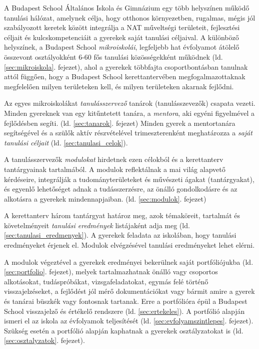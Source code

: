A Budapest School Általános Iskola és Gimnázium egy több helyszínen működő
tanulási hálózat, amelynek célja, hogy otthonos környezetben, rugalmas, mégis
jól szabályozott keretek között integrálja a NAT
műveltségi
területeit, fejlesztési céljait és kulcskompetenciáit a gyerekek saját tanulási
céljaival. A különböző helyszínek, a Budapest
School \emph{mikroiskolái}, legfeljebb hat évfolyamot átölelő összevont
osztályokként
6-60 fős tanulási közösségekként működnek (ld. \ref{sec:mikroiskola}. fejezet),
ahol a gyerekek többfajta
csoportbontásban tanulnak attól függően, hogy a Budapest School
kerettantervében megfogalmazottaknak megfelelően milyen területeken kell, és
milyen területeken akarnak fejlődni.

Az egyes mikroiskolákat \emph{tanulásszervező} tanárok (tanulásszevezők)
csapata
vezeti.
Minden gyereknek van egy kitűntetett tanára, a \emph{mentora},
aki egyéni figyelmével a fejlődésben segíti.
(ld. \ref{sec:tanarok}. fejezet)
Minden gyerek a mentortanára segítségével és a szülők aktív
részvételével trimeszterenként meghatározza a \emph{saját tanulási céljait}
(ld.
\ref{sec:tanulasi_celok}).

A tanulásszervezők \emph{modulokat} hirdetnek ezen célokból és a kerettanterv
tantárgyainak tartalmából. A modulok reflektálnak a
mai világ alapvető kérdéseire,
integrálják	a tudományterületeket és művészeti ágakat (tantárgyakat),
és egyenlő lehetőséget adnak a tudásszerzésre, az önálló gondolkodásre és az
alkotásra a gyerekek mindennapjaiban. (ld. \ref{sec:modulok}. fejezet)

A kerettanterv három tantárgyat határoz meg, azok
témaköreit, tartalmát és követelményeit \emph{tanulási eredmények}
listájaként adja meg (ld. \ref{sec:tanulasi_eredmenyek}). A gyerekek feladata
az iskolában, hogy tanulási eredményeket
érjenek el. Modulok elvégzésével tanulási eredményeket lehet
elérni.

A modulok végeztével a gyerekek eredményei bekerülnek saját portfóliójukba (ld.
\ref{sec:portfolio}. fejezet),
melyek tartalmazhatnak önálló vagy csoportos alkotásokat, tudáspróbákat, vizsgafeladatokat,
egymás felé történő visszajelzéseket, a fejlődést jól mérő dokumentációkat vagy
bármit amire a gyerek és tanárai büszkék vagy fontosnak tartanak.
Erre a portfólióra épül a Budapest School visszajelző és értékelő rendszere
(ld. \ref{sec:ertekeles}). A
portfólió alapján ismeri el az iskola az évfolyamok teljesítését (ld. \ref{sec:evfolyamszintlepes}. fejezet). Szükség
esetén a portfólió alapján kaphatnak a gyerekek osztályzatokat is (ld. \ref{sec:osztalyzatok}. fejezet).

